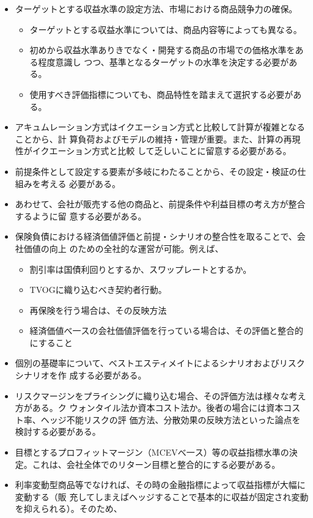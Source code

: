 \documentclass[report,gutter=10mm,fore-edge=10mm,uplatex,dvipdfmx]{jlreq}
\begin{document}
\begin{itemize}
 \item ターゲットとする収益水準の設定方法、市場における商品競争力の確保。
\begin{itemize}
 \item ターゲットとする収益水準については、商品内容等によっても異なる。
 \item 初めから収益水準ありきでなく・開発する商品の市場での価格水準をある程度意識し
つつ、基準となるターゲットの水準を決定する必要がある。
 \item 使用すべき評価指標についても、商品特性を踏まえて選択する必要がある。
\end{itemize}
 \item アキュムレーション方式はイクエーション方式と比較して計算が複雑となることから、計
算負荷およびモデルの維持・管理が重要。また、計算の再現性がイクエーション方式と比較
して乏しいことに留意する必要がある。
 \item 前提条件として設定する要素が多岐にわたることから、その設定・検証の仕組みを考える
必要がある。
 \item あわせて、会社が販売する他の商品と、前提条件や利益目標の考え方が整合するように留
意する必要がある。
 \item 保険負債における経済価値評価と前提・シナリオの整合性を取ることで、会社価値の向上
のための全社的な運営が可能。例えば、
\begin{itemize}
 \item  割引率は国債利回りとするか、スワップレートとするか。
 \item TVOGに織り込むべき契約者行動。
 \item 再保険を行う場合は、その反映方法
 \item 経済価値べ一スの会社価値評価を行っている場合は、その評価と整合的にすること
\end{itemize}
 \item 個別の基礎率について、ベストエスティメイトによるシナリオおよびリスクシナリオを作
成する必要がある。
 \item リスクマージンをプライシングに織り込む場合、その評価方法は様々な考え方がある。ク
ウォンタイル法か資本コスト法か。後者の場合には資本コスト率、ヘッジ不能リスクの評
価方法、分散効果の反映方法といった論点を検討する必要がある。
 \item 目標とするプロフィットマージン（MCEVべ一ス）等の収益指標水準の決定。これは、会社全体でのリターン目標と整合的にする必要がある。
 \item 利率変動型商品等でなければ、その時の金融指標によって収益指標が大幅に変動する（販
充してしまえばヘッジすることで基本的に収益が固定され変動を抑えられる）。そのため、

\end{itemize}
\end{document}
